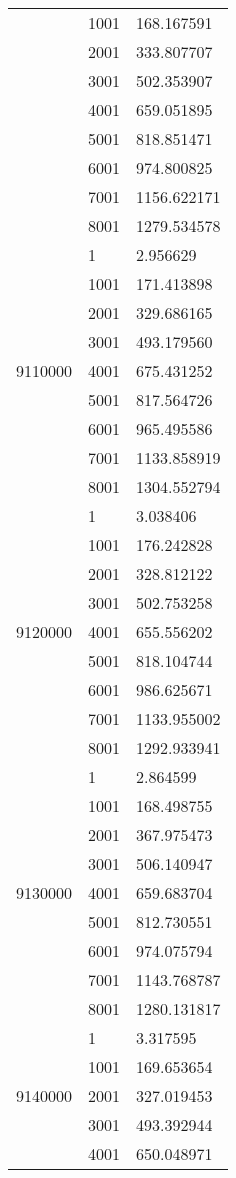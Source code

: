\begin{table}[htb!]
\begin{tabular}{lll}
 & 1001 & 168.167591 \\
 & 2001 & 333.807707 \\
 & 3001 & 502.353907 \\
 & 4001 & 659.051895 \\
 & 5001 & 818.851471 \\
 & 6001 & 974.800825 \\
 & 7001 & 1156.622171 \\
 & 8001 & 1279.534578 \\
\multirow[c]{9}{*}{9110000} & 1 & 2.956629 \\
 & 1001 & 171.413898 \\
 & 2001 & 329.686165 \\
 & 3001 & 493.179560 \\
 & 4001 & 675.431252 \\
 & 5001 & 817.564726 \\
 & 6001 & 965.495586 \\
 & 7001 & 1133.858919 \\
 & 8001 & 1304.552794 \\
\multirow[c]{9}{*}{9120000} & 1 & 3.038406 \\
 & 1001 & 176.242828 \\
 & 2001 & 328.812122 \\
 & 3001 & 502.753258 \\
 & 4001 & 655.556202 \\
 & 5001 & 818.104744 \\
 & 6001 & 986.625671 \\
 & 7001 & 1133.955002 \\
 & 8001 & 1292.933941 \\
\multirow[c]{9}{*}{9130000} & 1 & 2.864599 \\
 & 1001 & 168.498755 \\
 & 2001 & 367.975473 \\
 & 3001 & 506.140947 \\
 & 4001 & 659.683704 \\
 & 5001 & 812.730551 \\
 & 6001 & 974.075794 \\
 & 7001 & 1143.768787 \\
 & 8001 & 1280.131817 \\
\multirow[c]{9}{*}{9140000} & 1 & 3.317595 \\
 & 1001 & 169.653654 \\
 & 2001 & 327.019453 \\
 & 3001 & 493.392944 \\
 & 4001 & 650.048971 \\

\end{tabular}
\end{table}
